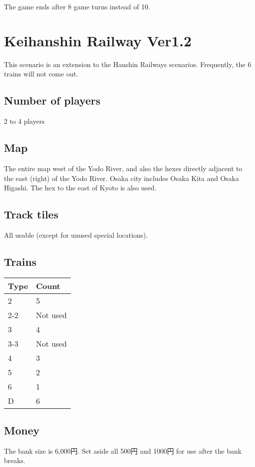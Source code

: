 \documentclass{article}
\begin{document}
\begin{CJK}{UTF8}{min}
\begin{multicols}{2}
The game ends after 8 game turns instead of 10.

\newpage
\section{Keihanshin Railway Ver1.2}

This scenario is an extension to the Hanshin Railways
scenarios. Frequently, the 6 trains will not come out.

\subsection{Number of players}

2 to 4 players

\subsection{Map}

The entire map west of the Yodo River, and also the hexes directly
adjacent to the east (right) of the Yodo River. Osaka city includes
Osaka Kita and Osaka Higashi. The hex to the east of Kyoto is also
used.

\subsection{Track tiles}

All usable (except for unused special locations).

\subsection{Trains}

\begin{tabular}{ll}
Type & Count \\
\hline
2 & 5 \\
2-2 & Not used \\
3 & 4 \\
3-3 & Not used \\
4 & 3 \\
5 & 2 \\
6 & 1 \\
D & 6 \\
\end{tabular}

\subsection{Money}
The bank size is 6,000円. Set aside all 500円 and 1000円 for
use after the bank breaks.


\end{multicols}
\end{CJK}
\end{document}
